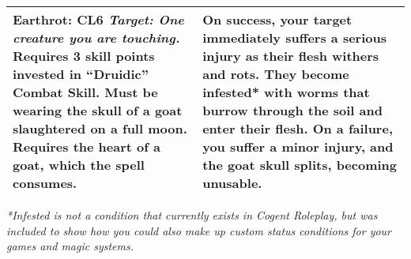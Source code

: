 \begin{center}
\begin{tabular}{|m{} m{}|}
      \hline

      \hspace*{.8em} \textbf{Earthrot: CL6} \newline
      \hspace*{.8em} \textit{Target: One creature you are touching.} \newline \newline
      Requires 3 skill points invested in “Druidic” Combat Skill.\newline \newline
      Must be wearing the skull of a goat slaughtered on a full moon.\newline \newline
      Requires the heart of a goat, which the spell consumes.&
        On success, your target immediately suffers a \textbf{serious injury} as their flesh withers and rots. They become \textbf{infested}* with worms that burrow through the soil and enter their flesh. On a failure, you suffer a minor injury, and the goat skull splits, becoming unusable.\\
      
      \hline
  \end{tabular}
\end{center}

\textit{*Infested is not a condition that currently exists in Cogent Roleplay, but was included to show how you could also make up custom status conditions for your games and magic systems.}